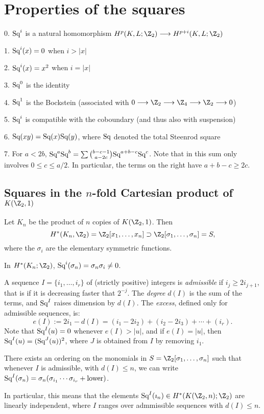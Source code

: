 \documentclass[11pt]{article}
\begin{document}
{\section{Properties of the squares}
\begin{itemise}
\item[0.] $\textup{Sq}^i$ is a natural homomorphism $H^p(K,L;\Z_2)\to H^{p+i}(K,L;\Z_2)$
\item[1.] $\textup{Sq}^i(x)=0$ when $i>|x|$
\item[2.] $\textup{Sq}^i(x)=x^2$ when $i=|x|$
\item[3.] $\textup{Sq}^0$ is the identity
\item[4.] $\textup{Sq}^1$ is the Bockstein (associated with $0\to\Z_2\to\Z_4\to\Z_2\to0$)
\item[5.] $\textup{Sq}^i$ is compatible with the coboundary (and thus also with suspension)
\item[6.] $\textup{Sq}(xy)=\textup{Sq}(x)\textup{Sq}(y)$, where $\textup{Sq}$ denoted the total Steenrod square
\item[7.] For $a<2b$, $\textup{Sq}^a\textup{Sq}^b=\sum\binom{b-c-1}{a-2c}\textup{Sq}^{a+b-c}\textup{Sq}^c$. Note that in this sum only involves $0\leq c\leq a/2$. In particular, the terms on the right have $a+b-c\geq 2c$.
\end{itemise}
\setcounter{subsection}{2}
\subsection{Squares in the \texorpdfstring{$n$-fold}{n-fold} Cartesian product of \texorpdfstring{$K(\Z_2,1)$}{K(Z/2,1)}}
Let $K_n$ be the product of $n$ copies of $K(\Z_2,1)$. Then 
\[H^*(K_n,\Z_2)=\Z_2[x_1,\ldots,x_n]\supset\Z_2[\sigma_1,\ldots,\sigma_n]=S,\]
where the $\sigma_i$ are the elementary symmetric functions.


\begin{prop*}
In $H^*(K_n;\Z_2)$, $\textup{Sq}^i(\sigma_n)=\sigma_n\sigma_i\neq0$.
\end{prop*}
A sequence $I=\{i_1,\ldots,i_r\}$ of (strictly positive) integers is \emph{admissible} if $i_j\geq 2i_{j+1}$, that is if it is decreasing faster that $2^{-j}$. The \emph{degree} $d(I)$ is the sum of the terms, and $\textup{Sq}^I$ raises dimension by $d(I)$. The \emph{excess}, defined only for admissible sequences, is:
\[e(I):=2i_1-d(I)=(i_1-2i_2)+(i_2-2i_3)+\cdots+(i_r).\]
Note that $\textup{Sq}^I(u)=0$ whenever $e(I)>|u|$, and if $e(I)=|u|$, then $\textup{Sq}^I(u)=(\textup{Sq}^J(u))^2$, where $J$ is obtained from $I$ by removing $i_1$.
\begin{thm*}
There exists an ordering on the monomials in $S=\Z_2[\sigma_1,\ldots,\sigma_n]$ such that whenever $I$ is admissible, with $d(I)\leq n$, we can write $\textup{Sq}^I(\sigma_n)=\sigma_n(\sigma_{i_1}\cdots\sigma_{i_r}+\textup{lower})$.
\end{thm*}
In particular, this means that the elements $\Squ^I(\imath_n)\in H^*(K(\Z_2,n);\Z_2)$ are linearly independent, where $I$ ranges over admmissible sequences with $d(I)\leq n$.

}
\end{document}

